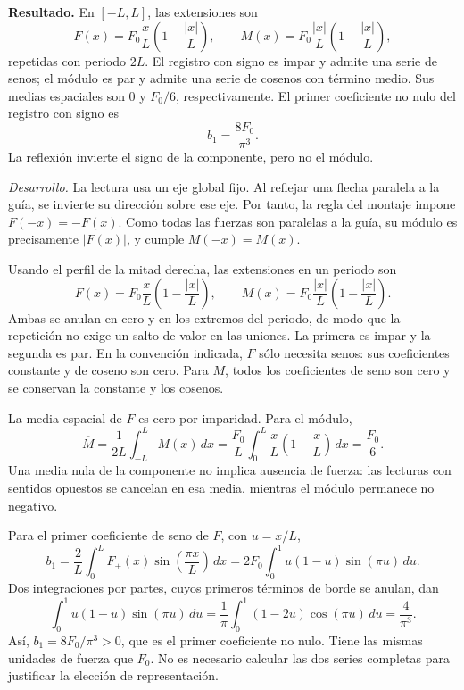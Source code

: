 \noindent\textbf{Resultado.} En \([-L,L]\), las extensiones son
\[
F(x)=F_0\frac{x}{L}\left(1-\frac{|x|}{L}\right),\qquad
M(x)=F_0\frac{|x|}{L}\left(1-\frac{|x|}{L}\right),
\]
repetidas con periodo \(2L\). El registro con signo es impar y admite una serie de senos; el módulo es par y admite una serie de cosenos con término medio. Sus medias espaciales son \(0\) y \(F_0/6\), respectivamente. El primer coeficiente no nulo del registro con signo es
\[
b_1=\frac{8F_0}{\pi^3}.
\]
La reflexión invierte el signo de la componente, pero no el módulo.

\noindent\textit{Desarrollo.} La lectura usa un eje global fijo. Al reflejar una flecha paralela a la guía, se invierte su dirección sobre ese eje. Por tanto, la regla del montaje impone \(F(-x)=-F(x)\). Como todas las fuerzas son paralelas a la guía, su módulo es precisamente \(|F(x)|\), y cumple \(M(-x)=M(x)\).

Usando el perfil de la mitad derecha, las extensiones en un periodo son
\[
F(x)=F_0\frac{x}{L}\left(1-\frac{|x|}{L}\right),
\qquad
M(x)=F_0\frac{|x|}{L}\left(1-\frac{|x|}{L}\right).
\]
Ambas se anulan en cero y en los extremos del periodo, de modo que la repetición no exige un salto de valor en las uniones. La primera es impar y la segunda es par. En la convención indicada, \(F\) sólo necesita senos: sus coeficientes constante y de coseno son cero. Para \(M\), todos los coeficientes de seno son cero y se conservan la constante y los cosenos.

La media espacial de \(F\) es cero por imparidad. Para el módulo,
\[
\overline M=\frac1{2L}\int_{-L}^{L}M(x)\,dx
=\frac{F_0}{L}\int_0^L\frac{x}{L}\left(1-\frac{x}{L}\right)\,dx
=\frac{F_0}{6}.
\]
Una media nula de la componente no implica ausencia de fuerza: las lecturas con sentidos opuestos se cancelan en esa media, mientras el módulo permanece no negativo.

Para el primer coeficiente de seno de \(F\), con \(u=x/L\),
\[
b_1=\frac2L\int_0^L F_+(x)\sin\left(\frac{\pi x}{L}\right)\,dx
=2F_0\int_0^1 u(1-u)\sin(\pi u)\,du.
\]
Dos integraciones por partes, cuyos primeros términos de borde se anulan, dan
\[
\int_0^1u(1-u)\sin(\pi u)\,du
=\frac1\pi\int_0^1(1-2u)\cos(\pi u)\,du
=\frac4{\pi^3}.
\]
Así, \(b_1=8F_0/\pi^3>0\), que es el primer coeficiente no nulo. Tiene las mismas unidades de fuerza que \(F_0\). No es necesario calcular las dos series completas para justificar la elección de representación.

